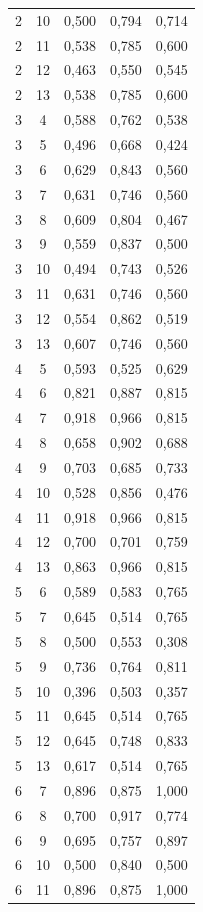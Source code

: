 \documentclass[12pt,a4paper,oneside]{report}
\begin{document}
\begin{longtable}{ccccc}
2 & 10 & 0,500 & 0,794 & 0,714 \\
2 & 11 & 0,538 & 0,785 & 0,600 \\
2 & 12 & 0,463 & 0,550 & 0,545 \\
2 & 13 & 0,538 & 0,785 & 0,600 \\
3 & 4 & 0,588 & 0,762 & 0,538 \\
3 & 5 & 0,496 & 0,668 & 0,424 \\
3 & 6 & 0,629 & 0,843 & 0,560 \\
3 & 7 & 0,631 & 0,746 & 0,560 \\
3 & 8 & 0,609 & 0,804 & 0,467 \\
3 & 9 & 0,559 & 0,837 & 0,500 \\
3 & 10 & 0,494 & 0,743 & 0,526 \\
3 & 11 & 0,631 & 0,746 & 0,560 \\
3 & 12 & 0,554 & 0,862 & 0,519 \\
3 & 13 & 0,607 & 0,746 & 0,560 \\
4 & 5 & 0,593 & 0,525 & 0,629 \\
4 & 6 & 0,821 & 0,887 & 0,815 \\
4 & 7 & 0,918 & 0,966 & 0,815 \\
4 & 8 & 0,658 & 0,902 & 0,688 \\
4 & 9 & 0,703 & 0,685 & 0,733 \\
4 & 10 & 0,528 & 0,856 & 0,476 \\
4 & 11 & 0,918 & 0,966 & 0,815 \\
4 & 12 & 0,700 & 0,701 & 0,759 \\
4 & 13 & 0,863 & 0,966 & 0,815 \\
5 & 6 & 0,589 & 0,583 & 0,765 \\
5 & 7 & 0,645 & 0,514 & 0,765 \\
5 & 8 & 0,500 & 0,553 & 0,308 \\
5 & 9 & 0,736 & 0,764 & 0,811 \\
5 & 10 & 0,396 & 0,503 & 0,357 \\
5 & 11 & 0,645 & 0,514 & 0,765 \\
5 & 12 & 0,645 & 0,748 & 0,833 \\
5 & 13 & 0,617 & 0,514 & 0,765 \\
6 & 7 & 0,896 & 0,875 & 1,000 \\
6 & 8 & 0,700 & 0,917 & 0,774 \\
6 & 9 & 0,695 & 0,757 & 0,897 \\
6 & 10 & 0,500 & 0,840 & 0,500 \\
6 & 11 & 0,896 & 0,875 & 1,000 \\

\end{longtable}
\end{document}

